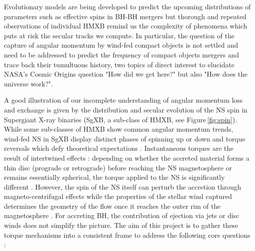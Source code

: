 \documentclass[letterpaper,12pt,onecolumn]{article}
\makeatletter
\newcommand{\sgx}{SgXB\xspace}
\newcommand*{\hmxb}{HMXB\@\xspace}
\newcommand*{\ns}{NS\@\xspace}
\newcommand*{\bh}{BH\@\xspace}
\makeatother
\begin{document}

Evolutionary models are being developed to predict the upcoming distributions of parameters such as effective spins in \bh-\bh mergers \citep{Belczynski2017} but thorough and repeated observations of individual \hmxb remind us the complexity of phenomena which puts at risk the secular tracks we compute. In particular, the question of the capture of angular momentum by wind-fed compact objects is not settled and need to be addressed to predict the frequency of compact objects mergers and trace back their tumultuous history, two topics of direct interest to elucidate NASA's Cosmic Origins question "How did we get here?" but also "How does the universe work?". 

A good illustration of our incomplete understanding of angular momentum loss and exchange is given by the distribution and secular evolution of the \ns spin in Supergiant X-ray binaries (\sgx, a sub-class of \hmxb, see Figure\,\ref{fig:spin}). While some sub-classes of \hmxb show common angular momentum trends, wind-fed \ns in \sgx display distinct phases of spinning up or down and torque reversals which defy theoretical expectations \citep{Hemphill2013}. Instantaneous torques are the result of intertwined effects : depending on whether the accreted material forms a thin disc (prograde or retrograde) before reaching the \ns magnetosphere or remains essentially spherical, the torque applied to the \ns is significantly different \citep{Ghosh1978,Shakura2012}. However, the spin of the \ns itself can perturb the accretion through magneto-centrifugal effects \citep{Bozzo2008} while the properties of the stellar wind captured determines the geometry of the flow once it reaches the outer rim of the magnetosphere \citep{ElMellah2018}. For accreting \bh, the contribution of ejection via jets or disc winds does not simplify the picture. The aim of this project is to gather these torque mechanisms into a consistent frame to address the following core questions :
\end{document}
